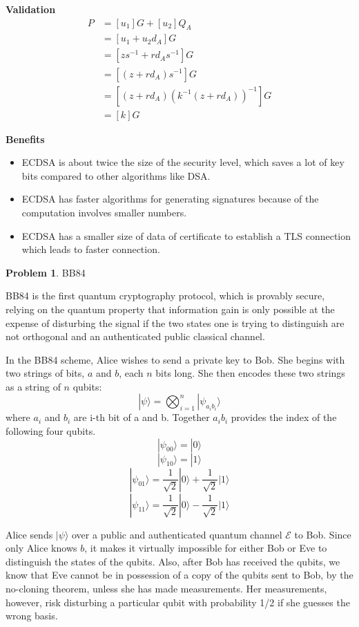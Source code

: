 \documentclass[12pt]{article}
\theoremstyle{definition}
\newtheorem{problem}{Problem}
\begin{document}
	\textbf{Validation}
	\begin{align*}
		P&=[u_1]G+[u_2]Q_A\\
		&=[u_1+u_2d_A]G\\
		&=[zs^{-1}+rd_As^{-1}]G\\
		&=[(z+rd_A)s^{-1}]G\\
		&=[(z+rd_A)(k^{-1}(z+rd_A))^{-1}]G\\
		&=[k]G
	\end{align*}
	
	\textbf{Benefits}
	\begin{itemize}
		\item ECDSA is about twice the size of the security level, which saves a lot of key bits compared to other algorithms like DSA.
		\item ECDSA has faster algorithms for generating signatures because of the computation involves smaller numbers.
		\item ECDSA has a smaller size of data of certificate to establish a TLS connection which leads to faster connection.
	\end{itemize}
	
	\begin{problem}
		BB84
	\end{problem}
	BB84 is the first quantum cryptography protocol, which is provably secure, relying on the quantum property that information gain is only possible at the expense of disturbing the signal if the two states one is trying to distinguish are not orthogonal and an authenticated public classical channel.
	
	In the BB84 scheme, Alice wishes to send a private key to Bob. She begins with two strings of bits, $a$ and $b$, each $n$ bits long. She then encodes these two strings as a string of $n$ qubits:
	$$|\psi\rangle=\bigotimes_{i=1}^n|\psi_{a_ib_i}\rangle$$
	where $a_i$ and $b_i$ are i-th bit of a and b. Together $a_ib_i$ provides the index of the following four qubits.
	$$|\psi_{00}\rangle=|0\rangle$$
	$$|\psi_{10}\rangle=|1\rangle$$
	$$|\psi_{01}\rangle=\frac{1}{\sqrt{2}}|0\rangle+\frac{1}{\sqrt{2}}|1\rangle$$
	$$|\psi_{11}\rangle=\frac{1}{\sqrt{2}}|0\rangle-\frac{1}{\sqrt{2}}|1\rangle$$
	
	Alice sends $|\psi \rangle$  over a public and authenticated quantum channel $\mathcal {E}$ to Bob. Since only Alice knows $b$, it makes it virtually impossible for either Bob or Eve to distinguish the states of the qubits. Also, after Bob has received the qubits, we know that Eve cannot be in possession of a copy of the qubits sent to Bob, by the no-cloning theorem, unless she has made measurements. Her measurements, however, risk disturbing a particular qubit with probability 1/2 if she guesses the wrong basis.
	
\end{document}
